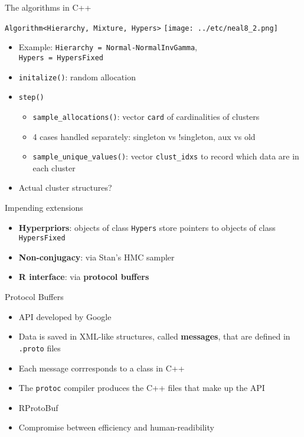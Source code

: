 \begin{frame}{The algorithms in C++}
	\begin{center}
		\texttt{Algorithm<Hierarchy, Mixture, Hypers>}
		\texttt{[image: ../etc/neal8\_2.png]}
	\end{center}
	\begin{itemize}
		\item Example: \texttt{Hierarchy = Normal-NormalInvGamma}, \\ \texttt{Hypers = HypersFixed}
		\item \texttt{initalize()}: random allocation
		\item \texttt{step()}
		\begin{itemize}
			\item \texttt{sample\_allocations()}: vector \texttt{card} of cardinalities of clusters
			\item 4 cases handled separately: singleton vs !singleton, aux vs old
			\item \texttt{sample\_unique\_values()}: vector \texttt{clust\_idxs} to record which data are in each cluster
		\end{itemize}
		\item Actual cluster structures?
	\end{itemize}
\end{frame}


\begin{frame}{Impending extensions}
	\begin{itemize}
	   \item \textbf{Hyperpriors}: objects of class \texttt{Hypers} store pointers to objects of class \texttt{HypersFixed} %
	   \item \textbf{Non-conjugacy}: via Stan's HMC sampler
	   \item  \textbf{R interface}: via \textbf{protocol buffers}
	\end{itemize}
\end{frame}

\begin{frame}{Protocol Buffers}
	\begin{itemize}
		\item API developed by Google
		\item Data is saved in XML-like structures, called \textbf{messages}, that are defined in \texttt{.proto} files
		\item Each message corrresponds to a class in C++
		\item The \texttt{protoc} compiler produces the C++ files that make up the API
		\item RProtoBuf
		\item Compromise between efficiency and human-readibility
	\end{itemize}
\end{frame}

